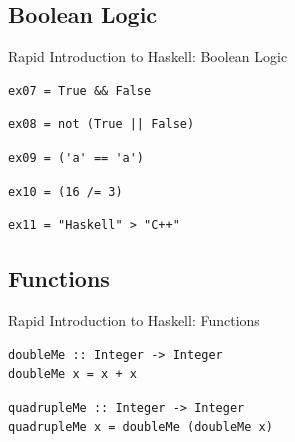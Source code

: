\documentclass[8pt,aspectratio=169]{beamer}
\begin{document}

\subsection{Boolean Logic}


\begin{frame}[fragile]{Rapid Introduction to Haskell: Boolean Logic}

\pause
\begin{verbatim}
ex07 = True && False
\end{verbatim}

\pause
\begin{verbatim}
ex08 = not (True || False)
\end{verbatim}

\pause
\begin{verbatim}
ex09 = ('a' == 'a')
\end{verbatim}

\pause
\begin{verbatim}
ex10 = (16 /= 3)
\end{verbatim}

\pause
\begin{verbatim}
ex11 = "Haskell" > "C++"
\end{verbatim}

\end{frame}


\subsection{Functions}


\begin{frame}[fragile]{Rapid Introduction to Haskell: Functions}

\pause
\begin{verbatim}
doubleMe :: Integer -> Integer
doubleMe x = x + x
\end{verbatim}

\pause
\begin{verbatim}
quadrupleMe :: Integer -> Integer
quadrupleMe x = doubleMe (doubleMe x)
\end{verbatim}

\end{frame}
\end{document}
